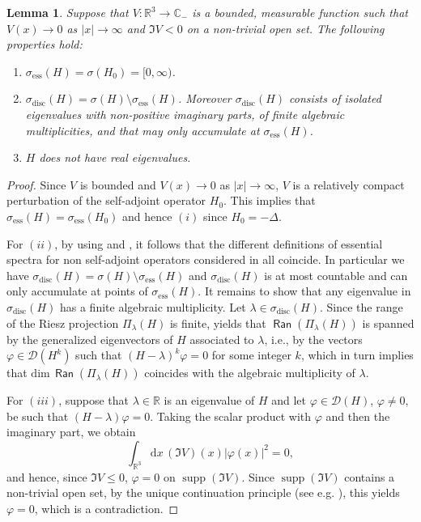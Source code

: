 \documentclass{article}
\def\C{\mathbb C}
\def\d{\mathrm{d}}
\def\R{\mathbb R}
\def\dom{\mathcal D}
\def\supp{\mathop{\mathrm{supp}}\nolimits}
\def\Ran{\mathop{\mathsf{Ran}}\nolimits}
\def\dim{\mathop{\mathrm{dim}}\nolimits}
\def\ess{{\mathrm{ess}}}
\def\disc{{\mathrm{disc}}}
\def\dim{{\mathrm{dim}}}
\newtheorem{Lemma}[Theorem]{Lemma}
\begin{document}
\begin{Lemma}
Suppose that $V:\R^3\to \C_-$ is a bounded, measurable function such that $V(x)\to0$ as $|x|\to\infty$ and $\Im V<0$ on a non-trivial open set. The following properties hold:
\begin{enumerate}[label=(\roman*)]
\item $\sigma_\ess(H)=\sigma(H_0)=[0,\infty)$.
\item $\sigma_\disc(H)=\sigma(H)\setminus\sigma_\ess(H)$. Moreover $\sigma_\disc(H)$ consists of isolated eigenvalues with non-positive imaginary parts, of finite algebraic multiplicities, and that may only accumulate at $\sigma_\ess(H)$.
\item $H$ does not have real eigenvalues.
\end{enumerate}
\end{Lemma}
 
 \begin{proof}
Since $V$ is bounded and $V(x)\to0$ as $|x|\to\infty$, $V$ is a relatively compact perturbation of the self-adjoint operator $H_0$. This implies that $\sigma_\ess(H)=\sigma_\ess(H_0)$ and hence $(i)$ since $H_0=-\Delta$. 

For $(ii)$, by using \cite[Cor. 2 of Thm. XIII.14]{RS4} and \cite[Thms IX.1.6 and
IX.2.1]{EdEv87}, it follows that the different definitions of essential spectra for non self-adjoint operators considered in \cite[Chap.~IX]{EdEv87} all coincide. In particular we have $\sigma_\disc(H)=\sigma(H)\setminus\sigma_\ess(H)$ and $\sigma_\disc(H)$ is at most countable and can only accumulate at points of $\sigma_\ess(H)$.
It remains to show that any eigenvalue in $\sigma_\disc(H)$ has a finite algebraic multiplicity. Let $\lambda\in\sigma_\disc(H)$. Since the range of the Riesz projection $\Pi_\lambda(H)$ is finite, \cite[Thm. XII.5 (d)]{RS4} yields that $\Ran(\Pi_\lambda(H))$ is spanned by the generalized eigenvectors of $H$
associated to $\lambda$, i.e., by the vectors $\varphi\in\dom(H^k)$ such that $(H-\lambda)^k\varphi = 0$ for some integer $k$, which in turn implies that $\dim\,\Ran(\Pi_\lambda(H))$ coincides with the algebraic multiplicity of $\lambda$.

For $(iii)$, suppose that $\lambda\in\R$ is an eigenvalue of $H$ and let $\varphi\in\dom(H)$, $\varphi\neq0$, be such that $(H-\lambda)\varphi=0$. Taking the scalar product with $\varphi$ and then the imaginary part, we obtain
$$
\int_{\R^3}\d x\, (\Im V)(x)|\varphi(x)|^2=0,
$$
and hence, since $\Im V\le0$, $\varphi=0$ on $\supp(\Im V)$. Since $\supp(\Im V)$ contains a non-trivial open set, by the unique continuation principle (see e.g. \cite[Thm.~XIII.63]{RS4}), this yields $\varphi=0$, which is a contradiction.
 \end{proof}
 
\end{document}
